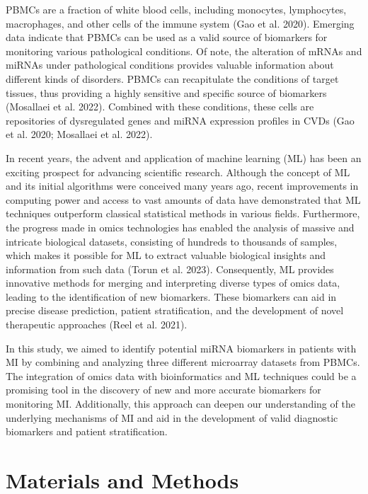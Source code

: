 \documentclass[smallextended]{svjour3}       %
\begin{document}
PBMCs are a fraction of white blood cells, including monocytes,
lymphocytes, macrophages, and other cells of the immune system (Gao et
al. 2020). Emerging data indicate that PBMCs can be used as a valid
source of biomarkers for monitoring various pathological conditions. Of
note, the alteration of mRNAs and miRNAs under pathological conditions
provides valuable information about different kinds of disorders. PBMCs
can recapitulate the conditions of target tissues, thus providing a
highly sensitive and specific source of biomarkers (Mosallaei et al.
2022). Combined with these conditions, these cells are repositories of
dysregulated genes and miRNA expression profiles in CVDs (Gao et al.
2020; Mosallaei et al. 2022).

In recent years, the advent and application of machine learning (ML) has
been an exciting prospect for advancing scientific research. Although
the concept of ML and its initial algorithms were conceived many years
ago, recent improvements in computing power and access to vast amounts
of data have demonstrated that ML techniques outperform classical
statistical methods in various fields. Furthermore, the progress made in
omics technologies has enabled the analysis of massive and intricate
biological datasets, consisting of hundreds to thousands of samples,
which makes it possible for ML to extract valuable biological insights
and information from such data (Torun et al. 2023). Consequently, ML
provides innovative methods for merging and interpreting diverse types
of omics data, leading to the identification of new biomarkers. These
biomarkers can aid in precise disease prediction, patient
stratification, and the development of novel therapeutic approaches
(Reel et al. 2021).

In this study, we aimed to identify potential miRNA biomarkers in
patients with MI by combining and analyzing three different microarray
datasets from PBMCs. The integration of omics data with bioinformatics
and ML techniques could be a promising tool in the discovery of new and
more accurate biomarkers for monitoring MI. Additionally, this approach
can deepen our understanding of the underlying mechanisms of MI and aid
in the development of valid diagnostic biomarkers and patient
stratification.

\hypertarget{materials-and-methods}{%
\section{Materials and Methods}\label{materials-and-methods}}
\end{document}
